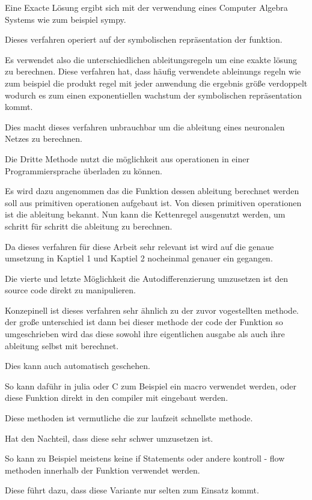 Eine Exacte Lösung ergibt sich mit der verwendung eines Computer Algebra Systems wie zum beispiel sympy.

Dieses verfahren operiert auf der symbolischen repräsentation der funktion.

Es verwendet also die unterschiedlichen ableitungsregeln um eine exakte lösung zu berechnen.
Diese verfahren hat, dass häufig verwendete ableinungs regeln wie zum beispiel die produkt regel
mit jeder anwendung die ergebnis größe verdoppelt wodurch es zum einen exponentiellen wachstum 
der symbolischen repräsentation kommt.

Dies macht dieses verfahren unbrauchbar um die ableitung eines neuronalen Netzes zu berechnen.


Die Dritte Methode nutzt die möglichkeit aus operationen 
in einer Programmiersprache überladen zu können.

Es wird dazu angenommen das die Funktion dessen ableitung berechnet werden soll aus primitiven operationen aufgebaut ist.
Von diesen primitiven operationen ist die ableitung bekannt.
Nun kann die Kettenregel ausgenutzt werden, um schritt für schritt die ableitung zu berechnen.

Da dieses verfahren für diese Arbeit sehr relevant ist wird auf die genaue umsetzung in Kaptiel 1 und Kaptiel 2 nocheinmal genauer ein gegangen.

Die vierte und letzte Möglichkeit die Autodifferenzierung umzusetzen ist den source code direkt zu manipulieren.

Konzepinell ist dieses verfahren sehr ähnlich zu der zuvor vogestellten methode. der große unterschied ist dann bei dieser methode der code der Funktion so umgeschrieben wird das diese sowohl ihre eigentlichen ausgabe als auch ihre ableitung selbst mit berechnet.

Dies kann auch automatisch geschehen.

So kann daführ in julia oder C zum Beispiel ein macro verwendet werden, oder diese Funktion direkt in den compiler mit eingebaut werden.

Diese methoden ist vermutliche die zur laufzeit schnellste methode.

Hat den Nachteil, dass diese sehr schwer umzusetzen ist.

So kann zu Beispiel meistens keine if Statements oder andere kontroll - flow methoden innerhalb der Funktion verwendet werden. 

Diese führt dazu, dass diese Variante nur selten zum Einsatz kommt.


